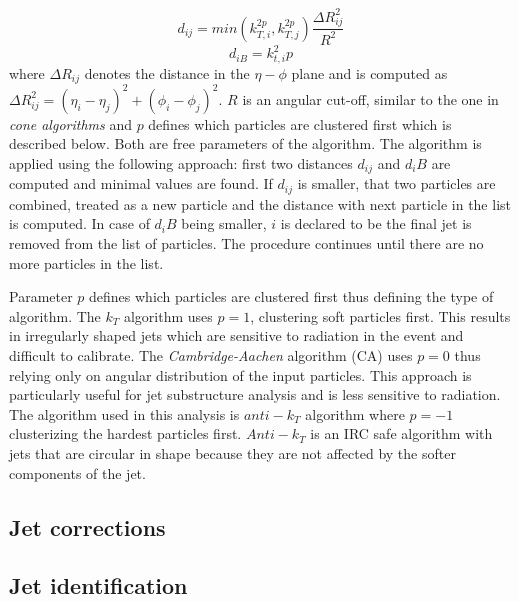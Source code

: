 \begin{equation}
d_{ij} = min(k_{T,i}^{2p},k_{T,j}^{2p}) \frac{\Delta R_{ij}^2}{R^2}
\end{equation}
\begin{equation}
d_{iB}=k_{t,i}^2p
\end{equation}
where $\Delta R_{ij}$ denotes the distance in the $\eta -\phi$ plane and is computed as $\Delta R_{ij}^2 = (\eta_i-\eta_j)^2+(\phi_i-\phi_j)^2$. $R$ is an angular cut-off, similar to the one in \textit{cone algorithms} and $p$ defines which particles are clustered first which is described below. Both are free parameters of the algorithm. The algorithm is applied using the following approach: first two distances $d_{ij}$ and $d_iB$ are computed and minimal values are found. If $d_{ij}$ is smaller, that two particles are combined, treated as a new particle and the distance with next particle in the list is computed. In case of $d_iB$ being smaller, $i$ is declared to be the final jet is removed from the list of particles. The procedure continues until there are no more particles in the list.
\par Parameter $p$ defines which particles are clustered first thus defining the type of algorithm. The $k_T$ algorithm uses $p=1$, clustering soft particles first. This results in irregularly shaped jets which are sensitive to radiation in the event and difficult to calibrate. The \textit{Cambridge-Aachen} algorithm (CA) uses $p=0$ thus relying only on angular distribution of the input particles. This approach is particularly useful for jet substructure analysis and is less sensitive to radiation. The algorithm used in this analysis is $anti-k_T$ algorithm where $p=-1$ clusterizing the hardest particles first. $Anti-k_T$ is an IRC safe algorithm with jets that are circular in shape because they are not affected by the softer components of the jet.       



\subsection{Jet corrections}




\subsection{Jet identification}

